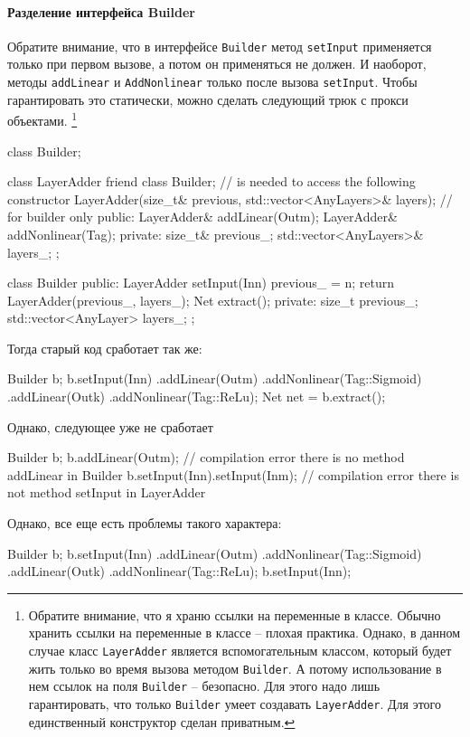 \paragraph{Разделение интерфейса Builder}

Обратите внимание, что в интерфейсе \verb"Builder" метод \verb"setInput" применяется только при первом вызове, а потом он применяться не должен.
И наоборот, методы \verb"addLinear" и \verb"AddNonlinear" только после вызова \verb"setInput".
Чтобы гарантировать это статически, можно сделать следующий трюк с прокси объектами.%
\footnote{Обратите внимание, что я храню ссылки на переменные в классе.
Обычно хранить ссылки на переменные в классе -- плохая практика.
Однако, в данном случае класс \texttt{LayerAdder} является вспомогательным классом, который будет жить только во время вызова методом \texttt{Builder}.
А потому использование в нем ссылок на поля \texttt{Builder} -- безопасно.
Для этого надо лишь гарантировать, что только \texttt{Builder} умеет создавать \texttt{LayerAdder}.
Для этого единственный конструктор сделан приватным.}
\begin{cppcode}
class Builder;

class LayerAdder {
  friend class Builder; // is needed to access the following constructor
  LayerAdder(size_t& previous, std::vector<AnyLayers>& layers); // for builder only
public:
  LayerAdder& addLinear(Out{m});
  LayerAdder& addNonlinear(Tag);
private:
  size_t& previous_;
  std::vector<AnyLayers>& layers_;
};

class Builder {
public:
  LayerAdder setInput(In{n}) {
    previous_ = n;
    return LayerAdder(previous_, layers_);
  }
  Net extract();
private:
  size_t previous_;
  std::vector<AnyLayer> layers_;
};
\end{cppcode}
Тогда старый код сработает так же:
\begin{cppcode}
Builder b;
b.setInput(In{n})
 .addLinear(Out{m})
 .addNonlinear(Tag::Sigmoid)
 .addLinear(Out{k})
 .addNonlinear(Tag::ReLu);
Net net = b.extract();
\end{cppcode}
Однако, следующее уже не сработает
\begin{cppcode}
Builder b;
b.addLinear(Out{m}); // compilation error there is no method addLinear in Builder
b.setInput(In{n}).setInput(In{m}); // compilation error there is not method setInput in LayerAdder
\end{cppcode}
Однако, все еще есть проблемы такого характера:
\begin{cppcode}
Builder b;
b.setInput(In{n})
 .addLinear(Out{m})
 .addNonlinear(Tag::Sigmoid)
 .addLinear(Out{k})
 .addNonlinear(Tag::ReLu);
b.setInput(In{n});
\end{cppcode}
